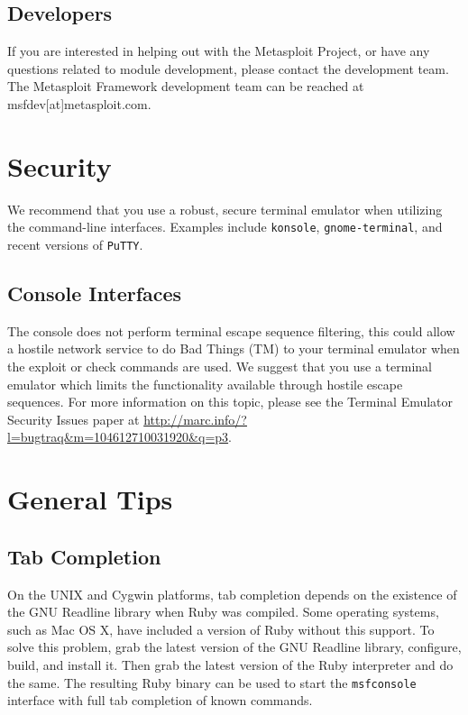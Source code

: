 \documentclass{report}
\begin{document}
\section{Developers}

\par
If you are interested in helping out with the Metasploit Project, or have any
questions related to module development, please contact the development team.
The Metasploit Framework development team can be reached at
msfdev[at]metasploit.com.

\pagebreak

\appendix

\pagebreak

\chapter{Security}

\par
We recommend that you use a robust, secure terminal emulator when utilizing the
command-line interfaces. Examples include \texttt{konsole},
\texttt{gnome-terminal}, and recent versions of \texttt{PuTTY}.

	\section{Console Interfaces}

\par
The console does not perform terminal escape sequence filtering, this could
allow a hostile network service to do Bad Things (TM) to your terminal emulator
when the exploit or check commands are used. We suggest that you use a terminal
emulator which limits the functionality available through hostile escape
sequences. For more information on this topic, please see the Terminal Emulator
Security Issues paper at
\url{http://marc.info/?l=bugtraq&m=104612710031920&q=p3}.

\pagebreak

\chapter{General Tips}

	\section{Tab Completion}
	\label{REF-TAB}

\par
On the UNIX and Cygwin platforms, tab completion depends on the existence of the
GNU Readline library when Ruby was compiled. Some operating systems, such as Mac
OS X, have included a version of Ruby without this support. To solve this
problem, grab the latest version of the GNU Readline library, configure, build,
and install it. Then grab the latest version of the Ruby interpreter and do the
same. The resulting Ruby binary can be used to start the \texttt{msfconsole}
interface with full tab completion of known commands.
\end{document}
